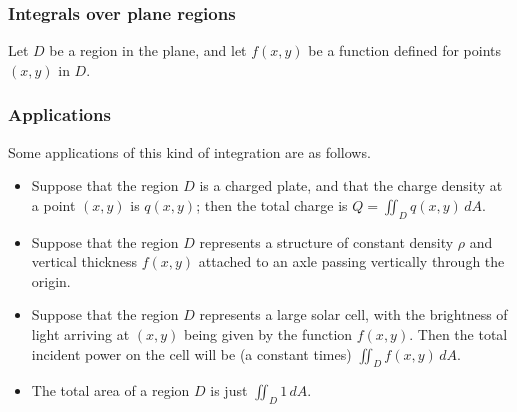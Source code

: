 \documentclass[9pt]{beamer}
\begin{document}

\begin{frame}[t]
 \frametitle{Integrals over plane regions}

 Let $D$ be a region in the plane, and let $f(x,y)$ be a function
 defined for points $(x,y)$ in $D$.  
\end{frame}


\begin{frame}[t]
 \frametitle{Applications}

 Some applications of this kind of integration are as follows.
 \begin{itemize}
  \item<2->[(a)] Suppose that the region $D$ is a charged plate, and that
   the charge density at a point $(x,y)$ is $q(x,y)$; then the total
   charge is $Q=\iint_Dq(x,y)\,dA$.
  \item<3->[(b)] Suppose that the region $D$ represents a structure of
   constant density $\rho$ and vertical thickness $f(x,y)$ attached to
   an axle passing vertically through the origin.  
  \item<6->[(c)] Suppose that the region $D$ represents a large solar cell,
   with the brightness of light arriving at $(x,y)$ being given by the
   function $f(x,y)$.  Then the total incident power on the cell will
   be (a constant times) $\iint_Df(x,y)\,dA$.  
  \item<7->[(d)] The total area of a region $D$ is just $\iint_D 1\,dA$.
 \end{itemize}

\end{frame}
\end{document}
